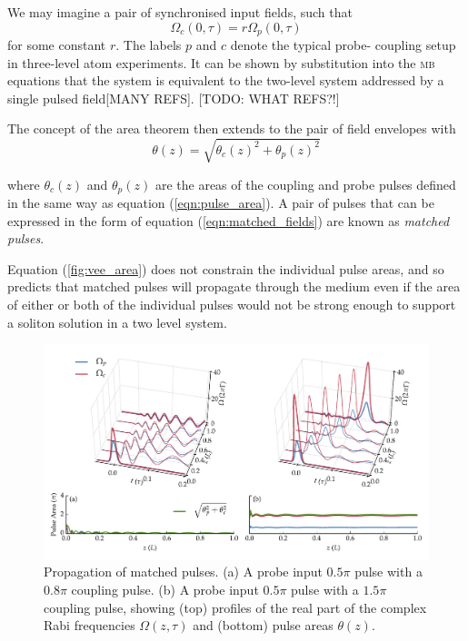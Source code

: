     We may imagine a pair of synchronised input fields, such that
    \begin{equation}
      \Omega_c(0, \tau) = r \Omega_p(0, \tau)
      \label{eqn:matched_fields}
    \end{equation}
    for some constant $r$. The labels $p$ and $c$ denote the typical probe-
    coupling setup in three-level atom experiments. It can be
    shown\cite{Rahman1998} by substitution into the \textsc{mb} equations that
    the system is equivalent to the two-level system addressed by a single
    pulsed field[MANY REFS]. [TODO: WHAT REFS?!]

    The concept of the area theorem then extends to the pair of field envelopes
    with
    \begin{equation}
      \theta(z) = \sqrt{\theta_c(z)^2 + \theta_p(z)^2}
      \label{fig:vee_area}
      \end{equation}

    where $\theta_c(z)$ and $\theta_p(z)$ are the areas of the coupling and
    probe pulses defined in the same way as equation (\ref{eqn:pulse_area}). A
    pair of pulses that can be expressed in the form of equation
    (\ref{eqn:matched_fields}) are known as \textit{matched pulses}.

    Equation (\ref{fig:vee_area}) does not constrain the individual pulse areas,
    and so predicts that matched pulses will propagate through the medium even
    if the area of either or both of the individual pulses would not be strong
    enough to support a soliton solution in a two level system.

    \begin{figure}[h]
      \includegraphics[width=\linewidth]
        {figs/03_nonlinear/mb_vee_sit_05pi_plot_nodecay_fig1.pdf}
      \caption{
      Propagation of matched pulses. (a) A probe input $0.5 \pi$ pulse with a
      $0.8 \pi$ coupling pulse. (b) A probe input $0.5 \pi$ pulse with a $1.5
      \pi$ coupling pulse, showing (top) profiles of the real part of the
      complex Rabi frequencies $\Omega(z, \tau)$ and (bottom) pulse areas
      $\theta(z)$.
      }
      \label{fig:vee_simultons}
    \end{figure}    

